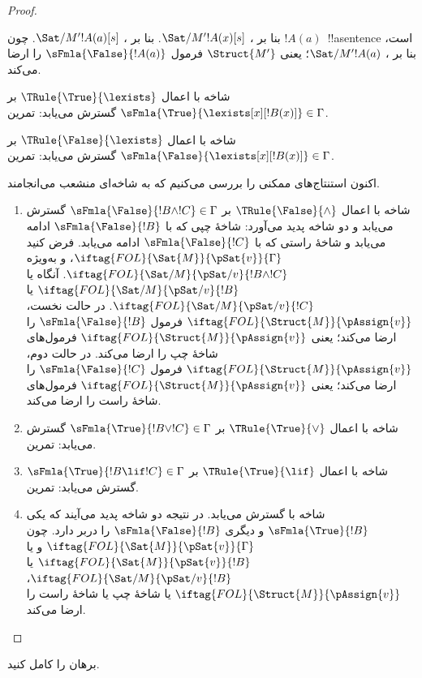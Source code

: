 \documentclass[../../../include/open-logic-section]{subfiles}
\begin{document}
\begin{proof}
\begin{enumerate}
{  بنا بر ،
  $\Sat/{M'}{!A(x)}[s]$. بنا بر
  ، $\Sat/{M'}{!A(a)}[s]$. چون
  $!A(a)$~!!a{sentence} است، بنا بر
  ، $\Sat/{M'}{!A(a)}$؛ یعنی
  $\Struct{M'}$ فرمول $\sFmla{\False}{!A(a)}$ را ارضا می‌کند.
\item شاخه با اعمال $\TRule{\True}{\lexists}$ بر
  $\sFmla{\True}{\lexists[x][!B(x)]} \in \Gamma$ گسترش می‌یابد: تمرین.
\item شاخه با اعمال $\TRule{\False}{\lexists}$ بر
  $\sFmla{\False}{\lexists[x][!B(x)]} \in \Gamma$ گسترش می‌یابد: تمرین.}{}
\end{enumerate}
اکنون استنتاج‌های ممکنی را بررسی می‌کنیم که به شاخه‌ای منشعب می‌انجامند.
\begin{enumerate}
\item شاخه با اعمال $\TRule{\False}{\land}$ بر
  $\sFmla{\False}{!B \land !C} \in \Gamma$ گسترش می‌یابد و دو شاخه
  پدید می‌آورد: شاخهٔ چپی که با $\sFmla{\False}{!B}$ ادامه می‌یابد و
  شاخهٔ راستی که با $\sFmla{\False}{!C}$ ادامه می‌یابد. فرض کنید
  $\iftag{FOL}{\Sat{M}}{\pSat{v}}{\Gamma}$، و به‌ویژه
  $\iftag{FOL}{\Sat/{M}}{\pSat/{v}}{!B \land !C}$. آنگاه یا
  $\iftag{FOL}{\Sat/{M}}{\pSat/{v}}{!B}$ یا
  $\iftag{FOL}{\Sat/{M}}{\pSat/{v}}{!C}$. در حالت نخست،
  $\iftag{FOL}{\Struct{M}}{\pAssign{v}}$ فرمول
  $\sFmla{\False}{!B}$ را ارضا می‌کند؛ یعنی
  $\iftag{FOL}{\Struct{M}}{\pAssign{v}}$ فرمول‌های شاخهٔ چپ را ارضا
  می‌کند. در حالت دوم، $\iftag{FOL}{\Struct{M}}{\pAssign{v}}$ فرمول
  $\sFmla{\False}{!C}$ را ارضا می‌کند؛ یعنی
  $\iftag{FOL}{\Struct{M}}{\pAssign{v}}$ فرمول‌های شاخهٔ راست را ارضا
  می‌کند.
\item شاخه با اعمال $\TRule{\True}{\lor}$ بر
  $\sFmla{\True}{!B \lor !C} \in \Gamma$ گسترش می‌یابد: تمرین.
\item شاخه با اعمال $\TRule{\True}{\lif}$ بر
  $\sFmla{\True}{!B \lif !C} \in \Gamma$ گسترش می‌یابد: تمرین.
\item شاخه با \Cut گسترش می‌یابد. در نتیجه دو شاخه پدید می‌آیند که
  یکی $\sFmla{\True}{!B}$ و دیگری $\sFmla{\False}{!B}$ را دربر دارد.
  چون $\iftag{FOL}{\Sat{M}}{\pSat{v}}{\Gamma}$ و یا
  $\iftag{FOL}{\Sat{M}}{\pSat{v}}{!B}$ یا
  $\iftag{FOL}{\Sat/{M}}{\pSat/{v}}{!B}$،
  $\iftag{FOL}{\Struct{M}}{\pAssign{v}}$ یا شاخهٔ چپ یا شاخهٔ راست را
  ارضا می‌کند.
\end{enumerate}
\end{proof}

\begin{prob}
برهان  را کامل کنید.
\end{prob}
\tagendprob
\end{document}
